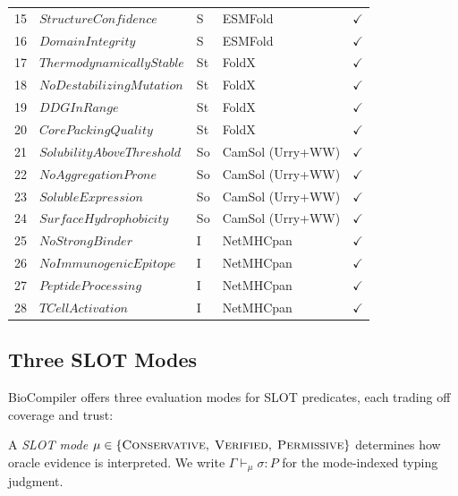 \documentclass[acmsmall,review,anonymous]{acmart}
\newcommand{\seq}{\sigma}
\newcommand{\pred}{P}
\newcommand{\CONSERVATIVE}{\textsc{Conservative}\xspace}
\newcommand{\VERIFIED}{\textsc{Verified}\xspace}
\newcommand{\PERMISSIVE}{\textsc{Permissive}\xspace}
\newcommand{\mode}{\mu}
\newcommand{\evalmode}[4]{#1 \vdash_{#2} #3 : #4}
\begin{document}
\begin{table}[t]
\begin{tabular}{clllc}
15 & $\mathit{StructureConfidence}$    & S  & ESMFold               & $\checkmark$ \\
16 & $\mathit{DomainIntegrity}$        & S  & ESMFold               & $\checkmark$ \\
\midrule
17 & $\mathit{ThermodynamicallyStable}$ & St & FoldX                & $\checkmark$ \\
18 & $\mathit{NoDestabilizingMutation}$ & St & FoldX                & $\checkmark$ \\
19 & $\mathit{DDGInRange}$            & St  & FoldX                 & $\checkmark$ \\
20 & $\mathit{CorePackingQuality}$    & St  & FoldX                 & $\checkmark$ \\
\midrule
21 & $\mathit{SolubilityAboveThreshold}$ & So & CamSol (Urry+WW)   & $\checkmark$ \\
22 & $\mathit{NoAggregationProne}$    & So  & CamSol (Urry+WW)     & $\checkmark$ \\
23 & $\mathit{SolubleExpression}$     & So  & CamSol (Urry+WW)     & $\checkmark$ \\
24 & $\mathit{SurfaceHydrophobicity}$ & So  & CamSol (Urry+WW)     & $\checkmark$ \\
\midrule
25 & $\mathit{NoStrongBinder}$        & I   & NetMHCpan             & $\checkmark$ \\
26 & $\mathit{NoImmunogenicEpitope}$  & I   & NetMHCpan             & $\checkmark$ \\
27 & $\mathit{PeptideProcessing}$     & I   & NetMHCpan             & $\checkmark$ \\
28 & $\mathit{TCellActivation}$       & I   & NetMHCpan             & $\checkmark$ \\
\bottomrule
\end{tabular}
\end{table}

\subsection{Three SLOT Modes}\label{sec:slot-modes}

BioCompiler offers three evaluation modes for SLOT predicates, each
trading off coverage and trust:

\begin{definition}
A \emph{SLOT mode} $\mode \in \{\CONSERVATIVE,\; \VERIFIED,\;
\PERMISSIVE\}$ determines how oracle evidence is interpreted.
We write $\evalmode{\Gamma}{\mode}{\seq}{\pred}$ for the mode-indexed
typing judgment.
\end{definition}
\end{document}
